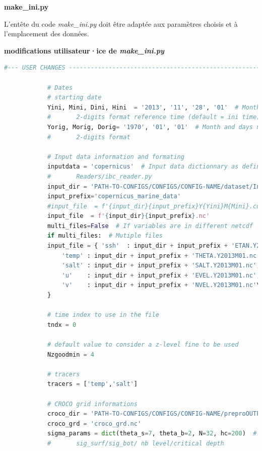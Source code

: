 \documentclass[10pt,a4paper,titlepage]{article}
\begin{document}
    
    \textbf{make\_ini.py}
    
    L'entête du code \textit{make\_ini.py} doit être adaptée aux paramètres choisis et à l'emplacement des données.
    
    \begin{codeEnv}{\textbf{modifications utilisateur·ice de \textit{make\_ini.py}}}
        \begin{lstlisting}[language=python]
            #--- USER CHANGES ---------------------------------------------------------
            
            # Dates
            # starting date
            Yini, Mini, Dini, Hini  = '2013', '11', '28', '01'  # Month and days need to be
            #       2-digits format reference time (default = ini time)
            Yorig, Morig, Dorig= '1970', '01', '01'  # Month and days need to be
            #       2-digits format
            
            # Input data information and formating
            inputdata = 'copernicus'  # Input data dictionnary as defined in the
            #       Readers/ibc_reader.py
            input_dir = 'PATH-TO-CONFIGS/CONFIGS/CONFIG-NAME/dataset/Ini/'
            input_prefix='copernicus_marine_data'
            #input_file  = f'{input_dir}{input_prefix}Y{Yini}M{Mini}.cdf'
            input_file  = f'{input_dir}{input_prefix}.nc'
            multi_files=False  # If variables are in different netcdf
            if multi_files:  # Mutiple files
            input_file = { 'ssh'  : input_dir + input_prefix + 'ETAN.Y2013M01.nc',\
                'temp' : input_dir + input_prefix + 'THETA.Y2013M01.nc',\
                'salt' : input_dir + input_prefix + 'SALT.Y2013M01.nc',\
                'u'    : input_dir + input_prefix + 'EVEL.Y2013M01.nc',\
                'v'    : input_dir + input_prefix + 'NVEL.Y2013M01.nc'\
            }
            
            # time index to use in the file
            tndx = 0
            
            # default value to consider a z-level fine to be used
            Nzgoodmin = 4
            
            # tracers
            tracers = ['temp','salt']
            
            # CROCO grid informations
            croco_dir = 'PATH-TO-CONFIGS/CONFIGS/CONFIG-NAME/preproOUTPUT/'
            croco_grd = 'croco_grd.nc'
            sigma_params = dict(theta_s=7, theta_b=2, N=32, hc=200)  # Vertical streching,
            #       sig_surf/sig_bot/ nb level/critical depth
            

\end{lstlisting}
\end{codeEnv}
\end{document}

